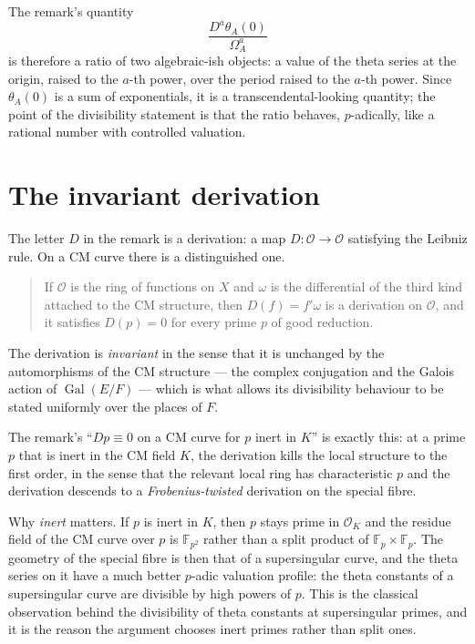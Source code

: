The remark's quantity
\begin{equation}
\frac{D^a\theta_A(0)}{\Omega_A^a}
\label{eq:ratio}
\end{equation}
is therefore a ratio of two algebraic-ish objects: a value of the theta series
at the origin, raised to the $a$-th power, over the period raised to the
$a$-th power. Since $\theta_A(0)$ is a sum of exponentials, it is a
transcendental-looking quantity; the point of the divisibility statement is
that the ratio behaves, $p$-adically, like a rational number with controlled
valuation.

\section{The invariant derivation}The letter $D$ in the remark is a derivation: a map $D : \mathcal{O} \to
\mathcal{O}$ satisfying the Leibniz rule. On a CM curve there is a
distinguished one.

\begin{quote}
If $\mathcal{O}$ is the ring of functions on $X$ and $\omega$ is the
differential of the third kind attached to the CM structure, then $D(f) =
f'\omega$ is a derivation on $\mathcal{O}$, and it satisfies $D(p) = 0$ for
every prime $p$ of good reduction.
\end{quote}

The derivation is \emph{invariant} in the sense that it is unchanged by the
automorphisms of the CM structure --- the complex conjugation and the Galois
action of $\operatorname{Gal}(E/F)$ --- which is what allows its divisibility
behaviour to be stated uniformly over the places of $F$.

The remark's ``$Dp \equiv 0$ on a CM curve for $p$ inert in $K$'' is exactly
this: at a prime $p$ that is inert in the CM field $K$, the derivation kills
the local structure to the first order, in the sense that the relevant
local ring has characteristic $p$ and the derivation descends to a
\emph{Frobenius-twisted} derivation on the special fibre.

Why \emph{inert} matters. If $p$ is inert in $K$, then $p$ stays prime in
$\mathcal{O}_K$ and the residue field of the CM curve over $p$ is $\mathbb{F}_{p^2}$
rather than a split product of $\mathbb{F}_p \times \mathbb{F}_p$. The
geometry of the special fibre is then that of a supersingular curve, and the
theta series on it have a much better $p$-adic valuation profile: the theta
constants of a supersingular curve are divisible by high powers of $p$. This is
the classical observation behind the divisibility of theta constants at
supersingular primes, and it is the reason the argument chooses inert primes
rather than split ones.

